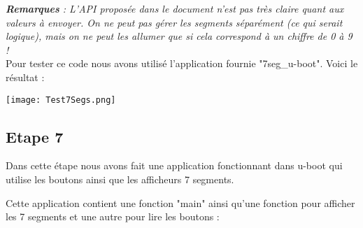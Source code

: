 \textit{\textbf{Remarques} : L'API proposée dans le document n'est pas très claire quant aux valeurs à envoyer. On ne peut pas gérer les segments séparément (ce qui serait logique), mais on ne peut les allumer que si cela correspond à un chiffre de 0 à 9 ! }\\


Pour tester ce code nous avons utilisé l'application fournie "7seg\_u-boot". Voici le résultat :

\begin{center} 
\hspace{12.45cm}
\texttt{[image: Test7Segs.png]}
\end{center}
\vspace{1cm} 

\pagebreak
\subsection{Etape 7}
Dans cette étape nous avons fait une application fonctionnant dans u-boot qui utilise les boutons ainsi que les afficheurs 7 segments.

Cette application contient une fonction "main" ainsi qu'une fonction pour afficher les 7 segments et une autre pour lire les boutons :

